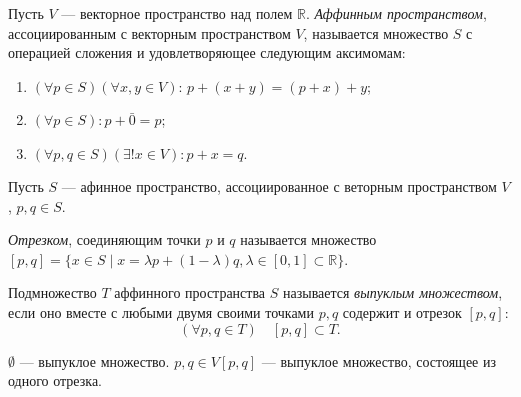 
\begin{definition}
	Пусть $V$ --- векторное пространство над полем $\mathbb{R}$. \textit{Аффинным пространством}, ассоциированным с векторным пространством $V$, называется множество $S$ с операцией сложения и удовлетворяющее следующим аксимомам:
	\begin{enumerate}[label={(\arabic*)}]
		\item $(\forall p \in S) (\forall x, y \in V): \, p + (x + y) = (p + x) + y$;
		
		\item $(\forall p \in S): p + \bar{0} = p$;
		
		\item $(\forall p, q \in S) (\exists! x \in V): p + x = q.$
	\end{enumerate}
\end{definition}


\begin{definition}
	Пусть $S$ --- афинное пространство, ассоциированное с веторным пространством $V$, $p, q \in S$.
	
	\textit{Отрезком}, соединяющим точки $p$ и $q$ называется множество $[p, q] = \{x \in S \mid x = \lambda p + (1 - \lambda) q, \lambda \in [0, 1] \subset \mathbb{R}\}$.
\end{definition}

\begin{definition}
	Подмножество $T$ аффинного пространства $S$ называется \textit{выпуклым множеством}, если оно вместе с любыми двумя своими точками $p, q$ содержит и отрезок $[p, q]$:
	\begin{equation*}
		(\forall p, q \in T) \quad [p, q] \subset T.
	\end{equation*}
	
	\begin{figure}[H]
		\centering 
		
	\end{figure}
	
	$\emptyset$ --- выпуклое множество.
	$p, q \in V [p, q]$ --- выпуклое множество, состоящее из одного отрезка.
\end{definition}

